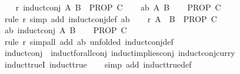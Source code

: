 \begin{isabellebody}
%
\isadelimproof
%
\endisadelimproof
%
\isatagproof
{}\isamarkupfalse%
\isanewline
\ \ \isamarkupfalse%
\ r{\isacharcolon}{\kern0pt}\ {\isachardoublequoteopen}induct{\isacharunderscore}{\kern0pt}conj\ A\ B\ {\isasymLongrightarrow}\ PROP\ C{\isachardoublequoteclose}\isanewline
\ \ \isamarkupfalse%
\ ab{\isacharcolon}{\kern0pt}\ A\ B\isanewline
\ \ \isamarkupfalse%
\ {\isachardoublequoteopen}PROP\ C{\isachardoublequoteclose}\ \isamarkupfalse%
\ {\isacharparenleft}{\kern0pt}rule\ r{\isacharparenright}{\kern0pt}\ {\isacharparenleft}{\kern0pt}simp\ add{\isacharcolon}{\kern0pt}\ induct{\isacharunderscore}{\kern0pt}conj{\isacharunderscore}{\kern0pt}def\ ab{\isacharparenright}{\kern0pt}\isanewline
{}\isamarkupfalse%
\isanewline
\ \ \isamarkupfalse%
\ r{\isacharcolon}{\kern0pt}\ {\isachardoublequoteopen}A\ {\isasymLongrightarrow}\ B\ {\isasymLongrightarrow}\ PROP\ C{\isachardoublequoteclose}\isanewline
\ \ \isamarkupfalse%
\ ab{\isacharcolon}{\kern0pt}\ {\isachardoublequoteopen}induct{\isacharunderscore}{\kern0pt}conj\ A\ B{\isachardoublequoteclose}\isanewline
\ \ \isamarkupfalse%
\ {\isachardoublequoteopen}PROP\ C{\isachardoublequoteclose}\ \isamarkupfalse%
\ {\isacharparenleft}{\kern0pt}rule\ r{\isacharparenright}{\kern0pt}\ {\isacharparenleft}{\kern0pt}simp{\isacharunderscore}{\kern0pt}all\ add{\isacharcolon}{\kern0pt}\ ab\ {\isacharbrackleft}{\kern0pt}unfolded\ induct{\isacharunderscore}{\kern0pt}conj{\isacharunderscore}{\kern0pt}def{\isacharbrackright}{\kern0pt}{\isacharparenright}{\kern0pt}\isanewline
{}\isamarkupfalse%
%
\endisatagproof
{\isafoldproof}%
%
\isadelimproof
\isanewline
%
\endisadelimproof
\isanewline
{}\isamarkupfalse%
\ induct{\isacharunderscore}{\kern0pt}conj\ {\isacharequal}{\kern0pt}\ induct{\isacharunderscore}{\kern0pt}forall{\isacharunderscore}{\kern0pt}conj\ induct{\isacharunderscore}{\kern0pt}implies{\isacharunderscore}{\kern0pt}conj\ induct{\isacharunderscore}{\kern0pt}conj{\isacharunderscore}{\kern0pt}curry\isanewline
\isanewline
{}\isamarkupfalse%
\ induct{\isacharunderscore}{\kern0pt}trueI{\isacharcolon}{\kern0pt}\ {\isachardoublequoteopen}induct{\isacharunderscore}{\kern0pt}true{\isachardoublequoteclose}\isanewline
%
\isadelimproof
\ \ %
\endisadelimproof
%
\isatagproof
{}\isamarkupfalse%
\ {\isacharparenleft}{\kern0pt}simp\ add{\isacharcolon}{\kern0pt}\ induct{\isacharunderscore}{\kern0pt}true{\isacharunderscore}{\kern0pt}def{\isacharparenright}{\kern0pt}%

\end{isabellebody}
